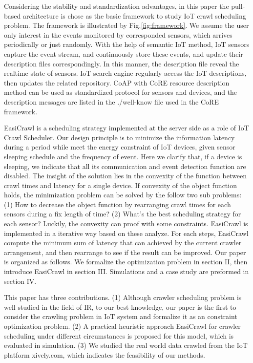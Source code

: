 \documentclass[conference]{IEEEtran}
\begin{document}
Considering the stability and standardization advantages, in this paper the pull-based architecture is chose as the basic framework to study IoT crawl scheduling problem. The framework is illustrated by Fig.\ref{fig:framework}. 
We assume the user only interest in the events monitored by corresponded sensors, which arrives periodically or just randomly. With the help of semantic IoT method, IoT sensors capture the event stream, and continuously store these events, and update their description files correspondingly. In this manner, the description file reveal the realtime state of sensors. IoT search engine regularly access the IoT descriptions, then updates the related repository. CoAP with CoRE resource description method can be used as standardized protocol for sensors and devices, and the description messages are listed in the ./well-know file used in the CoRE framework. 


EasiCrawl is a scheduling strategy implemented at the server side as a role of IoT Crawl Scheduler. Our design principle is to minimize the information latency during  a period while meet the energy constraint of IoT devices, given sensor sleeping schedule and the frequency of event. Here we clarify that, if a device is sleeping, we indicate that all its communication and event detection function are disabled.
The insight of the solution lies in the convexity of the function between crawl times and latency for a single device. If convexity of the object function holds, the minimization problem can be solved by the follow two sub problems: (1) How to decrease the object function by rearranging crawl times for each sensors during a fix length of time? (2) What's the best scheduling strategy for each sensor? Luckily, the convexity can proof with some constraints. EasiCrawl is implemented in a iterative way based on these analyze. For each steps, EasiCrawl compute the minimum sum of latency that can achieved by the current crawler arrangement, and then rearrange to see if the result can be improved.
Our paper is organized as follows. We formalize the optimization problem in section II, then introduce EasiCrawl in section III. Simulations and a case study are preformed in section IV. 

This paper has three contributions.
(1) Although crawler scheduling problem is well studied in the field of IR, to our best knowledge, our paper is the first to consider the crawling problem in IoT system and formalize it as an constraint optimization problem.
(2) A practical heuristic approach EasiCrawl for crawler scheduling under different circumstances is proposed for this model, which is evaluated in simulation.
(3) We studied the real world data crawled from the IoT platform xively.com, which indicates the feasibility of our methods.
\end{document}
